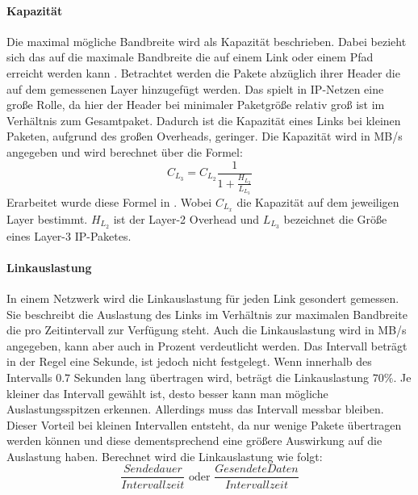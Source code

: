 \documentclass[draft=false
              ,paper=a4
              ,twoside=false
              ,fontsize=11pt
              ,headsepline
              ,BCOR10mm
              ,DIV11
              ]{scrbook}
\begin{document}
\paragraph{Kapazität} %
\label{par:kapazitat}
Die maximal mögliche Bandbreite wird als Kapazität beschrieben. Dabei bezieht sich das auf die maximale Bandbreite die auf einem Link oder einem Pfad erreicht werden kann \cite{prasad_bandwidth_2003}. Betrachtet werden die Pakete abzüglich ihrer Header die auf dem gemessenen Layer hinzugefügt werden. Das spielt in IP-Netzen eine große Rolle, da hier der Header bei minimaler Paketgröße relativ groß ist im Verhältnis zum Gesamtpaket. Dadurch ist die Kapazität eines Links bei kleinen Paketen, aufgrund des großen Overheads, geringer. Die Kapazität wird in MB/s angegeben und wird berechnet über die Formel: 
\begin{equation}
  C_{L_3} = C_{L_2} \frac{1}{1+\frac{H_{L_2}}{L_{L_3}}}
\end{equation}
Erarbeitet wurde diese Formel in \cite{prasad_bandwidth_2003}. Wobei $C_{L_x}$ die Kapazität auf dem jeweiligen Layer bestimmt. $H_{L_2}$ ist der Layer-2 Overhead und $L_{L_3}$ bezeichnet die Größe eines Layer-3 IP-Paketes.

\paragraph{Linkauslastung} %
\label{par:linkauslastung}
In einem Netzwerk wird die Linkauslastung für jeden Link gesondert gemessen. Sie beschreibt die Auslastung des Links im Verhältnis zur maximalen Bandbreite die pro Zeitintervall zur Verfügung steht. Auch die Linkauslastung wird in MB/s angegeben, kann aber auch in Prozent verdeutlicht werden. Das Intervall beträgt in der Regel eine Sekunde, ist jedoch nicht festgelegt. Wenn innerhalb des Intervalls $0.7$ Sekunden lang übertragen wird, beträgt die Linkauslastung $70\%$. Je kleiner das Intervall gewählt ist, desto besser kann man mögliche Auslastungsspitzen erkennen. Allerdings muss das Intervall messbar bleiben. Dieser Vorteil bei kleinen Intervallen entsteht, da nur wenige Pakete übertragen werden können und diese dementsprechend eine größere Auswirkung auf die Auslastung haben. Berechnet wird die Linkauslastung wie folgt:
\begin{equation}
  \label{eq:5}
  \frac{Sendedauer}{Intervallzeit} \textrm{ oder } \frac{GesendeteDaten}{Intervallzeit}
\end{equation}

\end{document}
